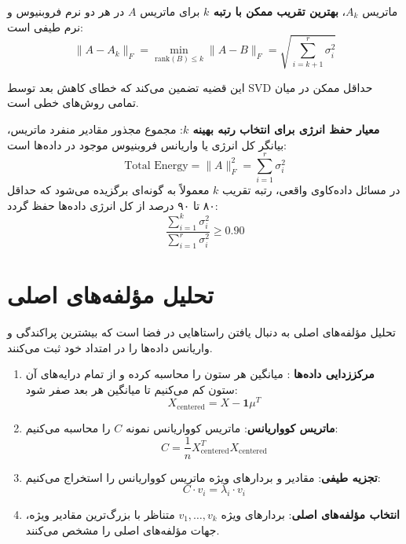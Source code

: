 \begin{theorem}
ماتریس $A_k$، \textbf{بهترین تقریب ممکن با رتبه $k$} برای ماتریس $A$ در هر دو نرم فروبنیوس و نرم طیفی است:
\begin{equation}
\|A - A_k\|_F = \min_{\text{rank}(B) \le k} \|A - B\|_F = \sqrt{\sum_{i=k+1}^r \sigma_i^2}
\end{equation}
\end{theorem}
این قضیه تضمین می‌کند که خطای کاهش بعد توسط SVD حداقل ممکن در میان تمامی روش‌های خطی است.

\textbf{معیار حفظ انرژی برای انتخاب رتبه بهینه $k$}:
مجموع مجذور مقادیر منفرد ماتریس، بیانگر کل انرژی یا واریانس فروبنیوس موجود در داده‌ها است:
\begin{equation}
\text{Total Energy} = \|A\|_F^2 = \sum_{i=1}^r \sigma_i^2
\end{equation}
در مسائل داده‌کاوی واقعی، رتبه تقریب $k$ معمولاً به گونه‌ای برگزیده می‌شود که حداقل ۸۰ تا ۹۰ درصد از کل انرژی داده‌ها حفظ گردد:
\begin{equation}
\frac{\sum_{i=1}^k \sigma_i^2}{\sum_{i=1}^r \sigma_i^2} \ge 0.90
\end{equation}

\section{تحلیل مؤلفه‌های اصلی \texorpdfstring{}{(Principal Component Analysis - PCA)}}
تحلیل مؤلفه‌های اصلی  به دنبال یافتن راستاهایی در فضا است که بیشترین پراکندگی و واریانس داده‌ها را در امتداد خود ثبت می‌کنند.

\begin{algorithmbox}
\begin{enumerate}
    \item \textbf{مرکززدایی داده‌ها }: میانگین هر ستون را محاسبه کرده و از تمام درایه‌های آن ستون کم می‌کنیم تا میانگین هر بعد صفر شود:
    \begin{equation}
    X_{\text{centered}} = X - \mathbf{1} \mu^T
    \end{equation}
    
    \item \textbf{ماتریس کوواریانس}: ماتریس کوواریانس نمونه $C$ را محاسبه می‌کنیم:
    \begin{equation}
    C = \frac{1}{n} X_{\text{centered}}^T X_{\text{centered}}
    \end{equation}
    
    \item \textbf{تجزیه طیفی}: مقادیر و بردارهای ویژه ماتریس کوواریانس را استخراج می‌کنیم:
    \begin{equation}
    C \cdot v_i = \lambda_i \cdot v_i
    \end{equation}
    
    \item \textbf{انتخاب مؤلفه‌های اصلی}: بردارهای ویژه $v_1, \dots, v_k$ متناظر با بزرگ‌ترین مقادیر ویژه، جهات مؤلفه‌های اصلی را مشخص می‌کنند.
\end{enumerate}
\end{algorithmbox}

